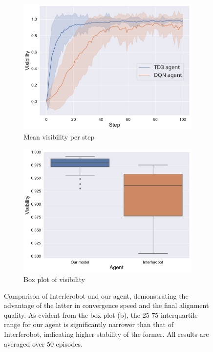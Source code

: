 \begin{figure}[ht]
    \begin{subfigure}[t]{0.5\textwidth}
        \includegraphics[width=\textwidth]{images/DQN_vs_TD3.pdf}
        \caption{Mean visibility per step}
        \label{fig:results_a}
    \end{subfigure}
    \begin{subfigure}[t]{0.5\textwidth}
        \includegraphics[width=\textwidth]{images/DQN_vs_TD3_box.pdf}
        \caption{Box plot of visibility}
        \label{fig:results_b}
    \end{subfigure}
    \caption{Comparison of Interferobot and our agent, demonstrating the advantage of the latter in convergence speed and the final alignment quality. As evident from the box plot (b), the 25-75  interquartile range for our agent is significantly narrower  than that of Interferobot, indicating higher stability of the former. %
    All results are averaged over 50 episodes.}
    \label{fig:results}
\end{figure}

